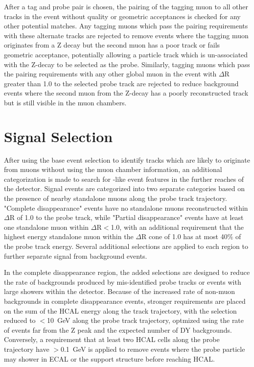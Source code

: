 After a tag and probe pair is chosen, the pairing of the tagging muon to all other tracks in the event without quality or geometric acceptances is checked for any other potential matches.
Any tagging muons which pass the pairing requirements with these alternate tracks are rejected to remove events where the tagging muon originates from a Z decay but the second muon has a poor track or fails geometric acceptance, potentially allowing a particle track which is un-associated with the Z-decay to be selected as the probe.
Similarly, tagging muons which pass the pairing requirements with any other global muon in the event with $\Delta$R greater than 1.0 to the selected probe track are rejected to reduce background events where the second muon from the Z-decay has a poorly reconstructed track but is still visible in the muon chambers.

\section{Signal Selection}
After using the base event selection to identify tracks which are likely to originate from muons without using the muon chamber information, an additional categorization is made to search for \dbrem-like event features in the further reaches of the detector.
Signal events are categorized into two separate categories based on the presence of nearby standalone muons along the probe track trajectory.
"Complete disappearance" events have no standalone muons reconstructed within $\Delta$R of 1.0 to the probe track, while "Partial disappearance" events have at least one standalone muon within $\Delta$R$<$1.0, with an additional requirement that the highest energy standalone muon within the $\Delta$R cone of 1.0 has at most 40$\%$ of the probe track energy.
Several additional selections are applied to each region to further separate signal from background events.

In the complete disappearance region, the added selections are designed to reduce the rate of backgrounds produced by mis-identified probe tracks or events with large showers within the detector.
Because of the increased rate of non-muon backgrounds in complete disappearance events, stronger requirements are placed on the sum of the HCAL energy along the track trajectory, with the selection reduced to $<$\SI{10}{\giga\eV} along the probe track trajectory, optmized using the rate of events far from the Z peak and the expected number of DY backgrounds. 
Conversely, a requirement that at least two HCAL cells along the probe trajectory have $>$\SI{0.1}{\giga\eV} is applied to remove events where the probe particle may shower in ECAL or the support structure before reaching HCAL.

